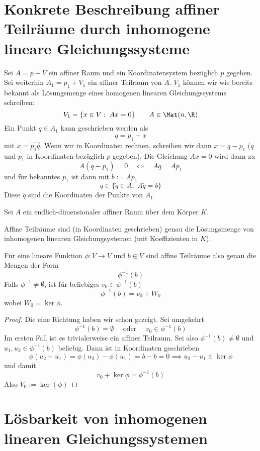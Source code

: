 \documentclass[a4paper, 10pt]{scrbook}
\begin{document}
\section{Konkrete Beschreibung affiner Teilräume durch inhomogene lineare Gleichungssysteme}

Sei $A=p+V$ ein affiner Raum und ein Koordinatensystem bezüglich $p$ gegeben.
Sei weiterhin $A_1 = p_1 + V_1$ ein affiner Teilraum von $A$.
$V_1$ können wir wie bereits bekannt als Lösungsmenge eines homogenen linearen Gleichungssystems schreiben:
\[
	V_1 = \{x\in V:\; Ax = 0\} \qquad A \in \Mat(n,\R)
\]
Ein Punkt $q\in A_1$ kann geschrieben werden als
\[
	q = p_1 + x
\]
mit $x=\vec{p_1q}$.
Wenn wir in Koordinaten rechnen, schreiben wir dann $x=q-p_1$ ($q$ und $p_1$ in Koordinaten bezüglich $p$ gegeben).
Die Gleichung $Ax=0$ wird dann zu
\[
	A(q-p_1)=0 \quad \iff \quad Aq =Ap_1
\]
und für bekanntes $p_1$ ist dann mit $b:=Ap_1$
\[
	q\in \{\tilde q\in A:\; A\tilde q = b\}
\]
Diese $\tilde q$ sind die Koordinaten der Punkte von $A_1$

\begin{kor} \label{kor:8.12}
	Sei $A$ ein endlich-dimensionaler affiner Raum über dem Körper $K$.

	Affine Teilräume sind (in Koordinaten geschrieben) genau die Lösungsmenge von inhomogenen linearen Gleichungsystemen (mit Koeffizienten in $K$).
	
	Für eine lineare Funktion $\phi:V\to V$ und $b\in V$ sind affine Teilräume also genau die Mengen der Form 
	\[
		\phi^{-1}(b)
	\]
	Falls $\phi^{-1}\neq\emptyset$, ist für beliebiges $v_0\in \phi^{-1}(b)$
	\[
		\phi^{-1}(b)=v_0+W_0
	\]
	wobei $W_0=\ker\phi$.
\begin{proof}
	Die eine Richtung haben wir schon gezeigt. 
	Sei umgekehrt
\[ 
	\phi^{-1}(b)=\emptyset \quad\text{ oder }\quad v_0\in \phi^{-1}(b)
\]
Im ersten Fall ist es trivialerweise ein affiner Teilraum.
Sei also $\phi^{-1}(b)\neq \emptyset$ und $u_1,u_2\in \phi^{-1}(b)$ beliebig.
Dann ist in Koordinaten geschrieben
\[
	\phi(u_2 - u_1) = \phi(u_2) - \phi(u_1) = b - b = 0 \implies u_2 - u_1 \in \ker\phi
\]
und damit
\[
	v_0 + \ker\phi = \phi^{-1}(b)
\]
Also $V_0:=\ker(\phi)$
\end{proof}
\end{kor}

\section{Lösbarkeit von inhomogenen linearen Gleichungssystemen}
\end{document}
